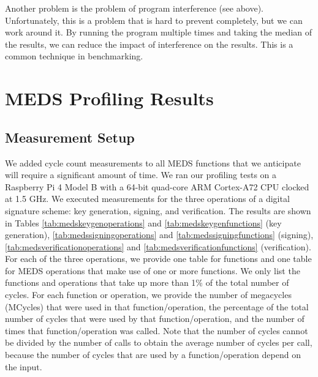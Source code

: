 \documentclass[11pt,a4paper]{report}
\begin{document}
Another problem is the problem of program interference (see above). Unfortunately, this is a problem that is hard to prevent completely, but we can work around it. By running the program multiple times and taking the median of the results, we can reduce the impact of interference on the results. This is a common technique in benchmarking.

\section{MEDS Profiling Results}
\subsection{Measurement Setup}
We added cycle count measurements to all MEDS functions that we anticipate will require a significant amount of time. We ran our profiling tests on a Raspberry Pi 4 Model B with a 64-bit quad-core ARM Cortex-A72 CPU clocked at 1.5 GHz. We executed measurements for the three operations of a digital signature scheme: key generation, signing, and verification. The results are shown in Tables \ref{tab:medskeygenoperations} and \ref{tab:medskeygenfunctions} (key generation), \ref{tab:medssigningoperations} and \ref{tab:medssigningfunctions} (signing), \ref{tab:medsverificationoperations} and \ref{tab:medsverificationfunctions} (verification). For each of the three operations, we provide one table for functions and one table for MEDS operations that make use of one or more functions. We only list the functions and operations that take up more than 1\% of the total number of cycles. For each function or operation, we provide the number of megacycles (MCycles) that were used in that function/operation, the percentage of the total number of cycles that were used by that function/operation, and the number of times that function/operation was called. Note that the number of cycles cannot be divided by the number of calls to obtain the average number of cycles per call, because the number of cycles that are used by a function/operation depend on the input.
\end{document}
